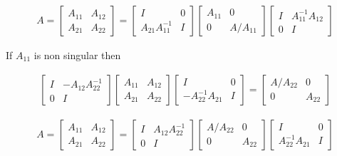 \begin{eqnarray*}
A = 
\begin{bmatrix}A_{11}&A_{12}\\A_{21}&A_{22}\end{bmatrix}
=  
\begin{bmatrix}I&0\\A_{21}A^{-1}_{11}&I\end{bmatrix} \begin{bmatrix}A_{11}&0\\0&A/A_{11}\end{bmatrix} 
\begin{bmatrix}I&A^{-1}_{11}A_{12}\\0&I \end{bmatrix}
\end{eqnarray*}



If $A_{11}$ is non singular then


\begin{eqnarray}
\begin{bmatrix}I&-A_{12}A_{22}^{-1}\\0&I\end{bmatrix}
\begin{bmatrix}A_{11}&A_{12}\\A_{21}&A_{22}\end{bmatrix} 
\begin{bmatrix}I&0\\-A_{22}^{-1}A_{21}&I\end{bmatrix}
= 
\begin{bmatrix}A/A_{22}&0\\0&A_{22}\end{bmatrix} 
\end{eqnarray}



\begin{eqnarray*}
A= 
\begin{bmatrix} A_{11}&A_{12}\\A_{21}&A_{22}\end{bmatrix} 
 =
\begin{bmatrix}I&A_{12}A^{-1}_{22}\\0&I\end{bmatrix} 
\begin{bmatrix}A/A_{22}&0\\0&A_{22}\end{bmatrix} 
\begin{bmatrix}I&0\\A^{-1}_{22}A_{21}&I\end{bmatrix}
\end{eqnarray*}


